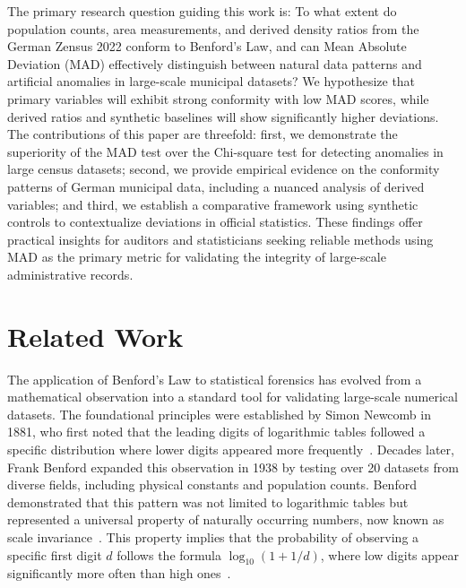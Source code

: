 \documentclass[11pt,a4paper]{article}
\begin{document}
The primary research question guiding this work is: To what extent do population counts, area measurements, and derived density ratios from the German Zensus 2022 conform to Benford's Law, and can Mean Absolute Deviation (MAD) effectively distinguish between natural data patterns and artificial anomalies in large-scale municipal datasets? We hypothesize that primary variables will exhibit strong conformity with low MAD scores, while derived ratios and synthetic baselines will show significantly higher deviations. The contributions of this paper are threefold: first, we demonstrate the superiority of the MAD test over the Chi-square test for detecting anomalies in large census datasets; second, we provide empirical evidence on the conformity patterns of German municipal data, including a nuanced analysis of derived variables; and third, we establish a comparative framework using synthetic controls to contextualize deviations in official statistics. These findings offer practical insights for auditors and statisticians seeking reliable methods using MAD as the primary metric for validating the integrity of large-scale administrative records.

\section{Related Work}
The application of Benford's Law to statistical forensics has evolved from a mathematical observation into a standard tool for validating large-scale numerical datasets. The foundational principles were established by Simon Newcomb in 1881, who first noted that the leading digits of logarithmic tables followed a specific distribution where lower digits appeared more frequently~\cite{Miller2015BenfordsLT}. Decades later, Frank Benford expanded this observation in 1938 by testing over 20 datasets from diverse fields, including physical constants and population counts. Benford demonstrated that this pattern was not limited to logarithmic tables but represented a universal property of naturally occurring numbers, now known as scale invariance~\cite{Miller2015BenfordsLT}. This property implies that the probability of observing a specific first digit $d$ follows the formula $\log_{10}(1 + 1/d)$, where low digits appear significantly more often than high ones~\cite{Durtschi2004TheEU}.
\end{document}
